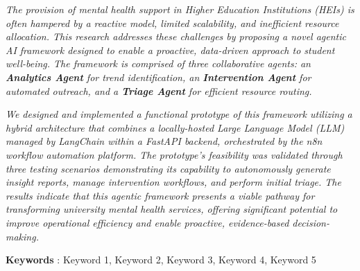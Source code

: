 \textit{
	The provision of mental health support in Higher Education Institutions (HEIs) is often hampered by a reactive model, limited scalability, and inefficient resource allocation. This research addresses these challenges by proposing a novel agentic AI framework designed to enable a proactive, data-driven approach to student well-being. The framework is comprised of three collaborative agents: an \textbf{Analytics Agent} for trend identification, an \textbf{Intervention Agent} for automated outreach, and a \textbf{Triage Agent} for efficient resource routing. 
}

\textit{
	We designed and implemented a functional prototype of this framework utilizing a hybrid architecture that combines a locally-hosted Large Language Model (LLM) managed by LangChain within a FastAPI backend, orchestrated by the n8n workflow automation platform. The prototype's feasibility was validated through three testing scenarios demonstrating its capability to autonomously generate insight reports, manage intervention workflows, and perform initial triage. The results indicate that this agentic framework presents a viable pathway for transforming university mental health services, offering significant potential to improve operational efficiency and enable proactive, evidence-based decision-making.
}

\noindent\textbf{Keywords} : Keyword 1, Keyword 2, Keyword 3, Keyword 4, Keyword 5